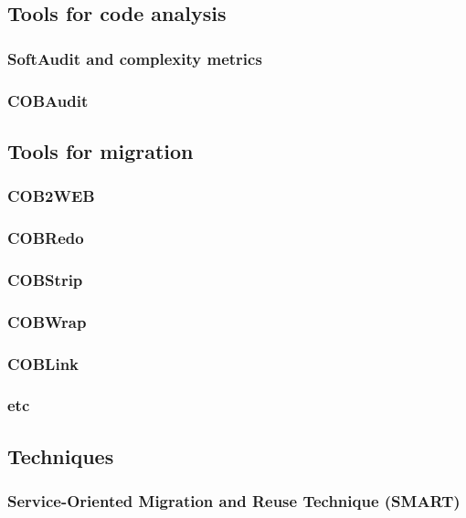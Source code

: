 \documentclass[a4paper,10pt]{article}
\begin{document}
\subsection{Tools for code analysis}

\subsubsection{SoftAudit and complexity metrics}

\subsubsection{COBAudit}

\subsection{Tools for migration}

\subsubsection{COB2WEB}

\subsubsection{COBRedo}

\subsubsection{COBStrip}

\subsubsection{COBWrap}

\subsubsection{COBLink}

\subsubsection{etc}

\subsection{Techniques}

\subsubsection{Service-Oriented Migration and Reuse Technique (SMART)}
\end{document}
